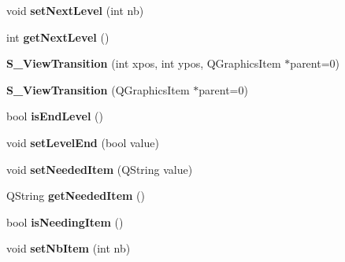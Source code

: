 \begin{DoxyCompactItemize}
\item 
\hypertarget{class_s___view_transition_a7aa555ea153a02bc957cce590c7f0660}{}void {\bfseries set\+Next\+Level} (int nb)\label{class_s___view_transition_a7aa555ea153a02bc957cce590c7f0660}

\item 
\hypertarget{class_s___view_transition_aef44e5819f80ec0689175510a7d50c37}{}int {\bfseries get\+Next\+Level} ()\label{class_s___view_transition_aef44e5819f80ec0689175510a7d50c37}

\item 
\hypertarget{class_s___view_transition_a114168f77853ed98ff87d750f2982b39}{}{\bfseries S\+\_\+\+View\+Transition} (int xpos, int ypos, Q\+Graphics\+Item $\ast$parent=0)\label{class_s___view_transition_a114168f77853ed98ff87d750f2982b39}

\item 
\hypertarget{class_s___view_transition_a95dbe7a7f23bb8ed903ad8dff6f7ea6a}{}{\bfseries S\+\_\+\+View\+Transition} (Q\+Graphics\+Item $\ast$parent=0)\label{class_s___view_transition_a95dbe7a7f23bb8ed903ad8dff6f7ea6a}

\item 
\hypertarget{class_s___view_transition_ab6671a5c3df741a34c2cff8194c8c428}{}bool {\bfseries is\+End\+Level} ()\label{class_s___view_transition_ab6671a5c3df741a34c2cff8194c8c428}

\item 
\hypertarget{class_s___view_transition_afbfd78f5dcb2edb6b5444c4e2a73110a}{}void {\bfseries set\+Level\+End} (bool value)\label{class_s___view_transition_afbfd78f5dcb2edb6b5444c4e2a73110a}

\item 
\hypertarget{class_s___view_transition_af81ef15e45fb55bc71e3e81acb88971a}{}void {\bfseries set\+Needed\+Item} (Q\+String value)\label{class_s___view_transition_af81ef15e45fb55bc71e3e81acb88971a}

\item 
\hypertarget{class_s___view_transition_a9c7c1d53104949673f340c808682806d}{}Q\+String {\bfseries get\+Needed\+Item} ()\label{class_s___view_transition_a9c7c1d53104949673f340c808682806d}

\item 
\hypertarget{class_s___view_transition_a9f623ff7ddaa749fe32af0149e4dc7b7}{}bool {\bfseries is\+Needing\+Item} ()\label{class_s___view_transition_a9f623ff7ddaa749fe32af0149e4dc7b7}

\item 
\hypertarget{class_s___view_transition_a5926082bed3cb63fd6eea5e6d2cfb875}{}void {\bfseries set\+Nb\+Item} (int nb)\label{class_s___view_transition_a5926082bed3cb63fd6eea5e6d2cfb875}


\end{DoxyCompactItemize}
